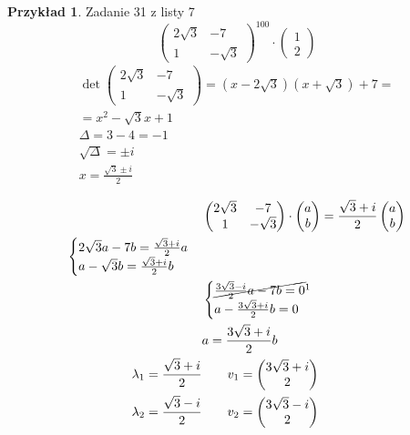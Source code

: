 \documentclass[10pt]{article}
\theoremstyle{definition}
\theoremstyle{definition}
\theoremstyle{definition}
\theoremstyle{definition}
\theoremstyle{remark}
\theoremstyle{definition}
\theoremstyle{definition}
\theoremstyle{definition}
\theoremstyle{definition}
\newtheorem*{prz}{Przykład}
\theoremstyle{definition}
\begin{document}
\begin{prz} Zadanie 31 z listy 7 
    \[ \begin{pmatrix} 2\sqrt{3} & -7 \\ 1 & -\sqrt{3} \end{pmatrix}^{100} \cdot \begin{pmatrix} 1 \\ 2 \end{pmatrix} \]
    \begin{align*}    
        \det \begin{pmatrix} 2\sqrt{3} & -7 \\ 1 & -\sqrt{3} \end{pmatrix} = (x-2\sqrt{3})(x+\sqrt{3}) + 7 = \\ 
        = x^2 - \sqrt{3}x + 1 \\ 
        \Delta = 3 - 4 = -1 \\ 
        \sqrt{\Delta} = \pm i \\ 
        x = \frac{\sqrt{3} \pm i}{2} \\ 
    \end{align*}
    \begin{align*}
        &\begin{pmatrix} 2\sqrt{3} & -7 \\ 1 & -\sqrt{3} \end{pmatrix} \cdot \begin{pmatrix} a \\ b \end{pmatrix} = 
        \frac{\sqrt{3} + i}{2} \begin{pmatrix} a \\ b \end{pmatrix} \\
        \begin{cases} 
            2\sqrt{3}a - 7b = \frac{\sqrt{3}+i}{2}a \\
            a - \sqrt{3} b = \frac{\sqrt{3}+i}{2} b
        \end{cases} \\ 
        &\begin{cases} 
            \cancel{\frac{3\sqrt{3}-i}{2} a - 7b = 0}\footnotemark \\ 
            a - \frac{3\sqrt{3}+i}{2}b = 0
        \end{cases} \\ 
        & a = \frac{3\sqrt{3} + i}{2} b \\ 
        \lambda_1 = \frac{\sqrt{3}+i}{2} & \qquad v_1 = \begin{pmatrix} 3\sqrt{3}+i \\ 2 \end{pmatrix} \\ 
        \lambda_2 = \frac{\sqrt{3}-i}{2} & \qquad v_2 = \begin{pmatrix} 3\sqrt 3-i \\ 2 \end{pmatrix} 
    \end{align*}
\end{prz}
\end{document}
